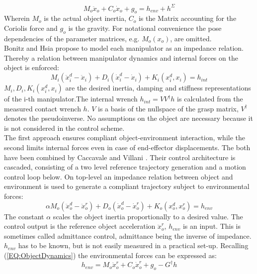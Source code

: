 \documentclass[a4paper,twoside, openright,12pt]{report}
\begin{document}
\begin{equation}\label{EQ:ObjectDynamics}
M_o \ddot{x}_o + C_o \dot{x}_o + g_o = h_{env} + h^\Sigma
\end{equation}
Wherein $ M_o $ is the actual object inertia, $ C_o $ is the Matrix accounting for the Coriolis force and $ g_o $ is the gravity. 
For notational convenience the pose dependencies of the parameter matrices, e.g. $ M_o(x_o) $, are omitted.\\
Bonitz and Hsia \cite{Bonitz_96} propose to model each manipulator as an impedance relation. Thereby a relation between manipulator dynamics and internal forces on the object is enforced:
\begin{equation}
M_i(\ddot{x}_i^d - \ddot{x}_i) + D_i (\dot{x}_i^d - \dot{x}_i) + K_i(x_i^d,x_i) = h_{int}
\end{equation}
$ M_i, D_i, K_i(x_i^d,x_i) $ are the desired inertia, damping and stiffness representations of the i-th manipulator.The internal wrench $ h_{int} = VV^\dagger h $ is calculated from the measured contact wrench $ h $. $ V $ is a basis of the nullspace of the grasp matrix, $ V^\dagger $ denotes the pseudoinverse. No assumptions on the object are necessary because it is not considered in the control scheme.\\ 
The first approach ensures compliant object-environment interaction, while the second limits internal forces even in case of end-effector displacements. The both have been combined by Caccavale and Villani \cite{Caccavale_01}. Their control architecture is cascaded, consisting of a two level reference trajectory generation and a motion control loop below. On top-level an impedance relation between object and environment is used to generate a compliant trajectory subject to environmental forces:
\begin{equation}
\alpha M_o(\ddot{x}_o^d - \ddot{x}_o^r)  + D_o(\dot{x}_o^d - \dot{x}_o^r) + K_o(x_o^d,x_o^r)  = h_{env}
\end{equation}
The constant $ \alpha $ scales the object inertia proportionally to a desired value.
The control output is the reference object acceleration $ \ddot{x}_o^r $, $ h_{env} $ is an input. This is sometimes called admittance control, admittance being the inverse of impedance. $ h_{env} $ has to be known, but is not easily measured in a practical set-up. Recalling (\ref{EQ:ObjectDynamics}) the environmental forces can be expressed as:
\begin{equation}
h_{env} =  M_o \ddot{x}_o^r + C_o \dot{x}_o^r + g_o - G^\dagger h
\end{equation}
\end{document}
